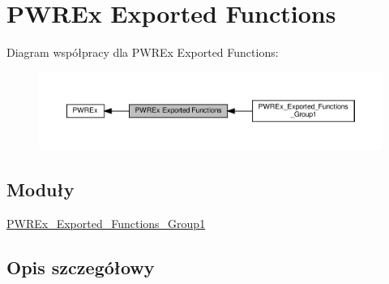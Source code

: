 \hypertarget{group___p_w_r_ex___exported___functions}{}\section{P\+W\+R\+Ex Exported Functions}
\label{group___p_w_r_ex___exported___functions}
Diagram współpracy dla P\+W\+R\+Ex Exported Functions\+:\nopagebreak
\begin{figure}[H]
\begin{center}
\leavevmode
\includegraphics[width=350pt]{group___p_w_r_ex___exported___functions}
\end{center}
\end{figure}
\subsection*{Moduły}
\begin{DoxyCompactItemize}
\item 
\hyperlink{group___p_w_r_ex___exported___functions___group1}{P\+W\+R\+Ex\+\_\+\+Exported\+\_\+\+Functions\+\_\+\+Group1}
\end{DoxyCompactItemize}


\subsection{Opis szczegółowy}
